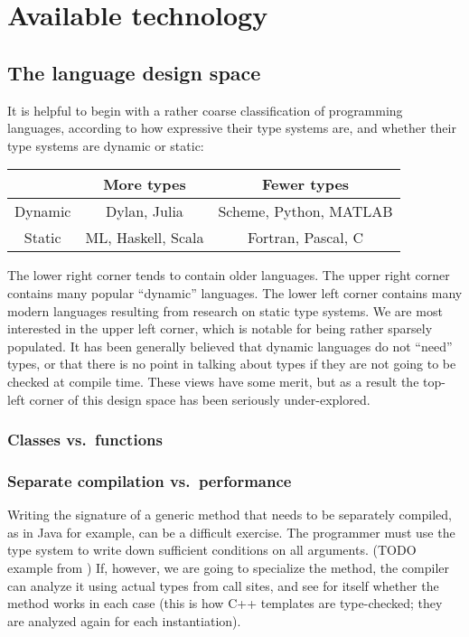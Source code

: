 \chapter{Available technology}


\section{The language design space}

It is helpful to begin with a rather coarse classification of programming
languages, according to how expressive their type systems are, and whether
their type systems are dynamic or static:

\vspace{3ex}

\begin{tabular}{|c||c|c|}
\hline 
 & More types & Fewer types\tabularnewline
\hline 
\hline 
Dynamic & Dylan, Julia & Scheme, Python, MATLAB\tabularnewline
\hline 
Static & ML, Haskell, Scala & Fortran, Pascal, C\tabularnewline
\hline 
\end{tabular}

\vspace{3ex}


The lower right corner tends to contain older languages. The upper right corner
contains many popular ``dynamic'' languages. The lower left corner contains
many modern languages resulting from research on static type systems.
We are most interested in the upper left corner, which is notable for being
rather sparsely populated. It has been generally believed that dynamic
languages do not ``need'' types, or that there is no point in talking about
types if they are not going to be checked at compile time. These views have
some merit, but as a result the top-left corner of this design space has
been seriously under-explored.

\subsection{Classes vs.\ functions}

\subsection{Separate compilation vs.\ performance}

Writing the signature of a generic method that needs to be separately compiled,
as in Java for example, can be a difficult exercise.
The programmer must use the type system to write down sufficient conditions on all
arguments.
(TODO example from \cite{Garcia:2003:CSL:949305.949317})
If, however, we are going to specialize the method, the compiler can analyze it
using actual types from call sites, and see for itself whether the method works
in each case (this is how C++ templates are type-checked; they are analyzed
again for each instantiation).

